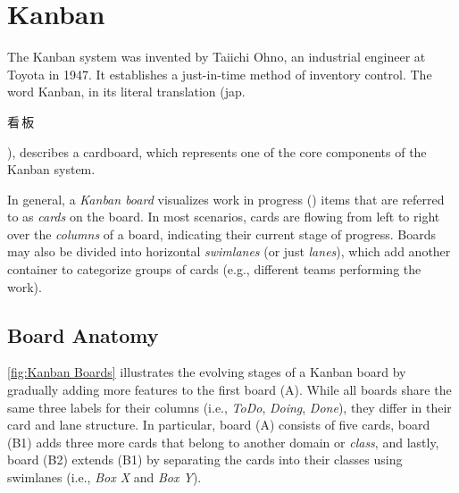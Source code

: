 \newpage



\section{Kanban}\label{sec:Kanban}

The Kanban system was invented by Taiichi Ohno, an industrial engineer at Toyota in 1947. It establishes a just-in-time method of inventory control.
The word Kanban, in its literal translation (jap. {\footnotesize \begin{CJK}{UTF8}{min}看\,板\end{CJK}}), describes a cardboard, which represents one of the core components of the Kanban system.

In general, a \textit{Kanban board} visualizes work in progress () items that are referred to as \textit{cards} on the board.
In most scenarios, cards are flowing from left to right over the \textit{columns} of a board, indicating their current stage of progress.
Boards may also be divided into horizontal \textit{swimlanes} (or just \textit{lanes}), which add another container to categorize groups of cards (e.g., different teams performing the work).

\subsection{Board Anatomy}

\autoref{fig:Kanban Boards} illustrates the evolving stages of a Kanban board by gradually adding more features to the first board (A). While all boards share the same three labels for their columns (i.e., \textit{ToDo}, \textit{Doing}, \textit{Done}), they differ in their card and lane structure. In particular, board (A) consists of five cards, board (B1) adds three more cards that belong to another domain or \textit{class}, and lastly, board (B2) extends (B1) by separating the cards into their classes using swimlanes (i.e., \textit{Box X} and \textit{Box Y}).


